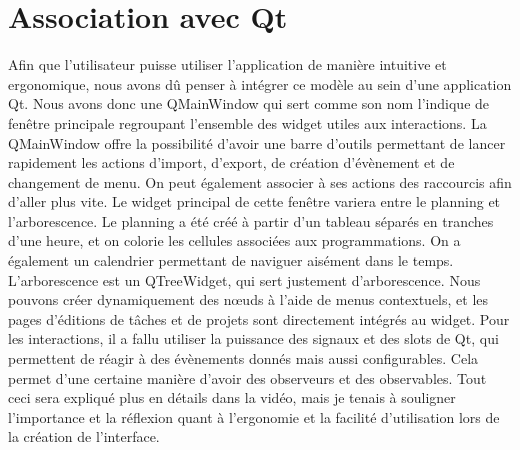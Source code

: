 \clanguage

\chapter{Association avec Qt}
Afin que l’utilisateur puisse utiliser l’application de manière intuitive et ergonomique, nous avons dû penser à intégrer ce modèle au sein d’une application Qt. 
Nous avons donc une QMainWindow qui sert comme son nom l’indique de fenêtre principale regroupant l’ensemble des widget utiles aux interactions. La QMainWindow offre la possibilité d’avoir une barre d’outils permettant de lancer rapidement les actions d’import, d’export, de création d’évènement et de changement de menu. On peut également associer à ses actions des raccourcis afin d’aller plus vite. 
Le widget principal de cette fenêtre variera entre le planning et l’arborescence. Le planning a été créé à partir d’un tableau séparés en tranches d’une heure, et on colorie les cellules associées aux programmations. On a également un calendrier permettant de naviguer aisément dans le temps.
L’arborescence est un QTreeWidget, qui sert justement d’arborescence. Nous pouvons créer dynamiquement des nœuds à l’aide de menus contextuels, et les pages d’éditions de tâches et de projets sont directement intégrés au widget. 
Pour les interactions, il a fallu utiliser la puissance des signaux et des slots de Qt, qui permettent de réagir à des évènements donnés mais aussi configurables. Cela permet d’une certaine manière d’avoir des observeurs et des observables. 
Tout ceci sera expliqué plus en détails dans la vidéo, mais je tenais à souligner l’importance et la réflexion quant à l’ergonomie et la facilité d’utilisation lors de la création de l’interface. 